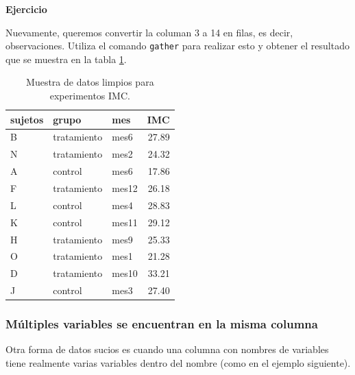 \documentclass[]{article}
\begin{document}
\textbf{Ejercicio}

Nuevamente, queremos convertir la columan 3 a 14 en filas, es decir,
observaciones. Utiliza el comando \texttt{gather} para realizar esto y
obtener el resultado que se muestra en la tabla \ref{tab:sujetostidy}.

\begin{table}[ht]
\centering
\begin{tabular}{lllr}
  \hline
sujetos & grupo & mes & IMC \\ 
  \hline
B & tratamiento & mes6 & 27.89 \\ 
  N & tratamiento & mes2 & 24.32 \\ 
  A & control & mes6 & 17.86 \\ 
  F & tratamiento & mes12 & 26.18 \\ 
  L & control & mes4 & 28.83 \\ 
  K & control & mes11 & 29.12 \\ 
  H & tratamiento & mes9 & 25.33 \\ 
  O & tratamiento & mes1 & 21.28 \\ 
  D & tratamiento & mes10 & 33.21 \\ 
  J & control & mes3 & 27.40 \\ 
   \hline
\end{tabular}
\caption{Muestra de datos limpios para experimentos IMC.} 
\label{tab:sujetostidy}
\end{table}

\subsubsection{Múltiples variables se encuentran en la misma
columna}\label{multiples-variables-se-encuentran-en-la-misma-columna}

Otra forma de datos sucios es cuando una columna con nombres de
variables tiene realmente varias variables dentro del nombre (como en el
ejemplo siguiente).
\end{document}
